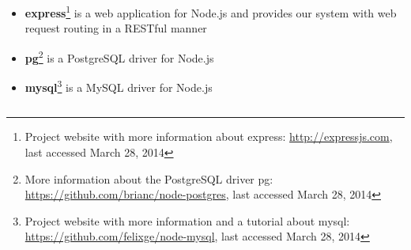 \documentclass[master,english]{hgbthesis}
\begin{document}
\begin{itemize}

\item \textbf{express}\footnote{Project website with more information about express: \url{http://expressjs.com}, last accessed March 28, 2014} is a web application for Node.js and provides our system with web request routing in a RESTful manner

\item \textbf{pg}\footnote{More information about the PostgreSQL driver pg: \url{https://github.com/brianc/node-postgres}, last accessed March 28, 2014} is a PostgreSQL driver for Node.js

\item \textbf{mysql}\footnote{Project website with more information and a tutorial about mysql: \url{https://github.com/felixge/node-mysql}, last accessed March 28, 2014} is a MySQL driver for Node.js

\end{itemize}

\begin{lstlisting}[style=BashInputStyle,caption={Script to install the used Node.js modules},label={lst:nodemodules}]

\end{lstlisting}
\end{document}
